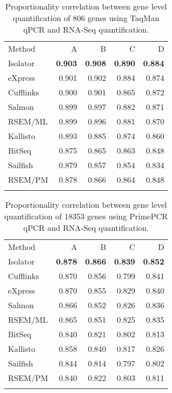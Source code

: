 \documentclass[twocolumn]{article}
\begin{document}
\begin{table}
\begin{tabular}[c]{@{}lrrrr@{}}
\toprule\addlinespace
Method & A & B & C & D
\\\addlinespace
\midrule
Isolator & \textbf{0.903} & \textbf{0.908} & \textbf{0.890} &
\textbf{0.884}
\\\addlinespace
eXpress & 0.901 & 0.902 & 0.884 & 0.874
\\\addlinespace
Cufflinks & 0.900 & 0.901 & 0.865 & 0.872
\\\addlinespace
Salmon & 0.899 & 0.897 & 0.882 & 0.871
\\\addlinespace
RSEM/ML & 0.899 & 0.896 & 0.881 & 0.870
\\\addlinespace
Kallisto & 0.893 & 0.885 & 0.874 & 0.860
\\\addlinespace
BitSeq & 0.875 & 0.865 & 0.863 & 0.848
\\\addlinespace
Sailfish & 0.879 & 0.857 & 0.854 & 0.834
\\\addlinespace
RSEM/PM & 0.878 & 0.866 & 0.864 & 0.848
\\\addlinespace
\bottomrule
\addlinespace
\end{tabular}
\caption{Proportionality correlation between gene level quantification
of 806 genes using TaqMan qPCR and RNA-Seq quantification.}
\end{table}

\begin{table}\begin{tabular}[c]{@{}lrrrr@{}}
\toprule\addlinespace
Method & A & B & C & D
\\\addlinespace
\midrule
Isolator & \textbf{0.878} & \textbf{0.866} & \textbf{0.839} &
\textbf{0.852}
\\\addlinespace
Cufflinks & 0.870 & 0.856 & 0.799 & 0.841
\\\addlinespace
eXpress & 0.870 & 0.855 & 0.829 & 0.840
\\\addlinespace
Salmon & 0.866 & 0.852 & 0.826 & 0.836
\\\addlinespace
RSEM/ML & 0.865 & 0.851 & 0.825 & 0.835
\\\addlinespace
BitSeq & 0.840 & 0.821 & 0.802 & 0.813
\\\addlinespace
Kallisto & 0.858 & 0.840 & 0.817 & 0.826
\\\addlinespace
Sailfish & 0.844 & 0.814 & 0.797 & 0.802
\\\addlinespace
RSEM/PM & 0.840 & 0.822 & 0.803 & 0.811
\\\addlinespace
\bottomrule
\addlinespace
\end{tabular}
\caption{Proportionality correlation between gene level quantification
of 18353 genes using PrimePCR qPCR and RNA-Seq quantification.}
\end{table}
\end{document}

